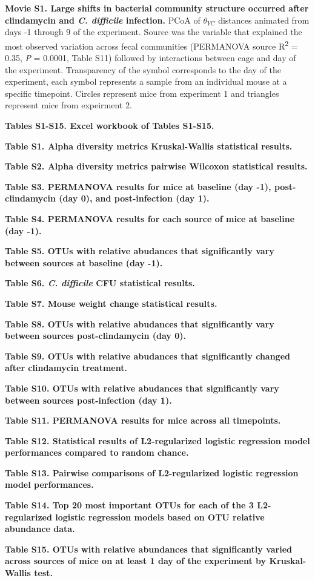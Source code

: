 \documentclass[
  11pt,
]{article}
\begin{document}
\textbf{Movie S1. Large shifts in bacterial community structure occurred
after clindamycin and \emph{C. difficile} infection.} PCoA of
\(\theta_{YC}\) distances animated from days -1 through 9 of the
experiment. Source was the variable that explained the most observed
variation across fecal communities (PERMANOVA source
R\textsuperscript{2} = 0.35, \emph{P} = 0.0001, Table S11) followed by
interactions between cage and day of the experiment. Transparency of the
symbol corresponds to the day of the experiment, each symbol represents
a sample from an individual mouse at a specific timepoint. Circles
represent mice from experiment 1 and triangles represent mice from
expeirment 2.

\textbf{Tables S1-S15. Excel workbook of Tables S1-S15.}

\textbf{Table S1. Alpha diversity metrics Kruskal-Wallis statistical
results.}

\textbf{Table S2. Alpha diversity metrics pairwise Wilcoxon statistical
results.}

\textbf{Table S3. PERMANOVA results for mice at baseline (day -1),
post-clindamycin (day 0), and post-infection (day 1).}

\textbf{Table S4. PERMANOVA results for each source of mice at baseline
(day -1).}

\textbf{Table S5. OTUs with relative abudances that significantly vary
between sources at baseline (day -1).}

\textbf{Table S6. \emph{C. difficile} CFU statistical results.}

\textbf{Table S7. Mouse weight change statistical results.}

\textbf{Table S8. OTUs with relative abudances that significantly vary
between sources post-clindamycin (day 0).}

\textbf{Table S9. OTUs with relative abudances that significantly
changed after clindamycin treatment.}

\textbf{Table S10. OTUs with relative abudances that significantly vary
between sources post-infection (day 1).}

\textbf{Table S11. PERMANOVA results for mice across all timepoints.}

\textbf{Table S12. Statistical results of L2-regularized logistic
regression model performances compared to random chance.}

\textbf{Table S13. Pairwise comparisons of L2-regularized logistic
regression model performances.}

\textbf{Table S14. Top 20 most important OTUs for each of the 3
L2-regularized logistic regression models based on OTU relative
abundance data.}

\textbf{Table S15. OTUs with relative abundances that significantly
varied across sources of mice on at least 1 day of the experiment by
Kruskal-Wallis test.}
\end{document}
